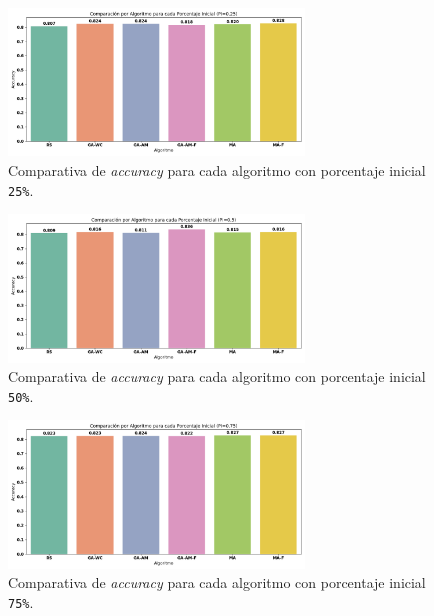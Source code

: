 \begin{figure}[htp]
    \centering
    \includegraphics[width=0.7\textwidth]{imagenes/evaluaciones/final/barplot-por-pi/pi-25.png}
    \caption{Comparativa de \textit{accuracy} para cada algoritmo con porcentaje inicial \texttt{25\%}.}
    \label{fig:barplot-por-pi-25}
\end{figure}

\begin{figure}[htp]
    \centering
    \includegraphics[width=0.7\textwidth]{imagenes/evaluaciones/final/barplot-por-pi/pi-50.png}
    \caption{Comparativa de \textit{accuracy} para cada algoritmo con porcentaje inicial \texttt{50\%}.}
    \label{fig:barplot-por-pi-50}
\end{figure}

\begin{figure}[htp]
    \centering
    \includegraphics[width=0.7\textwidth]{imagenes/evaluaciones/final/barplot-por-pi/pi-75.png}
    \caption{Comparativa de \textit{accuracy} para cada algoritmo con porcentaje inicial \texttt{75\%}.}
    \label{fig:barplot-por-pi-75}
\end{figure}

